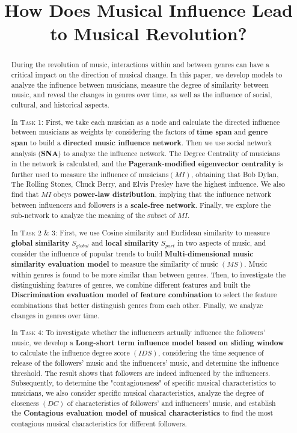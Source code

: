 \documentclass[12pt]{article}  %
\title{How Does Musical Influence Lead to Musical Revolution?}  %
\begin{document}
\begin{abstract}
During the revolution of music, interactions within and between genres can have a critical impact on the direction of musical change. In this paper, we develop models to analyze the influence between musicians, measure the degree of similarity between music, and reveal the changes in genres over time, as well as the influence of social, cultural, and historical aspects.

In \textsc{Task 1:} First, we take each musician as a node and calculate the directed influence between musicians as weights by considering the factors of \textbf{time span} and \textbf{genre span} to build a \textbf{directed music influence network}. Then we use social network analysis (\textbf{SNA}) to analyze the influence network. The Degree Centrality of musicians in the network is calculated, and the \textbf{Pagerank-modified eigenvector centrality} is further used to measure the influence of musicians$(MI)$, obtaining that Bob Dylan, The Rolling Stones, Chuck Berry, and Elvis Presley have the highest influence. We also find that $MI$ obeys \textbf{power-law distribution}, implying that the influence network between influencers and followers is a \textbf{scale-free network}. Finally, we explore the sub-network to analyze the meaning of the subset of $MI$.

In \textsc{Task 2 \& 3:} First, we use Cosine similarity and Euclidean similarity to measure \textbf{global similarity} $S_{global}$ and \textbf{local similarity} $S_{part}$ in two aspects of music, and consider the influence of popular trends to build \textbf{Multi-dimensional music similarity evaluation model} to measure the similarity of music $(MS)$. Music within genres is found to be more similar than between genres. Then, to investigate the distinguishing features of genres, we combine different features and built the \textbf{Discrimination evaluation model of feature combination} to select the feature combinations that better distinguish genres from each other. Finally, we analyze changes in genres over time.

In \textsc{Task 4:} To investigate whether the influencers actually influence the followers' music, we develop a \textbf{Long-short term influence model based on sliding window} to calculate the influence degree score $(IDS)$, considering the time sequence of release of the followers' music and the influencers' music, and determine the influence threshold. The result shows that followers are indeed influenced by the influencers. Subsequently, to determine the "contagiousness" of specific musical characteristics to musicians, we also consider specific musical characteristics, analyze the degree of closeness $(DC)$ of characteristics of followers' and influencers' music, and establish the \textbf{Contagious evaluation model of musical characteristics} to find the most contagious musical characteristics for different followers.


\end{abstract}
\end{document}
